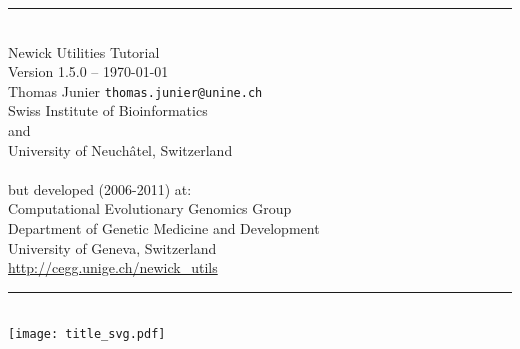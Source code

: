 \documentclass[a4paper,10pt]{report}
\newcommand{\Hrule}[1]{\rule{\linewidth}{#1}}
\begin{document}
\nobibliography*

\begin{titlepage}
\begin{center}
\Hrule{0.5mm} \\[0.8cm]
{\Huge Newick Utilities Tutorial} \\[0.5cm]
Version 1.5.0 -- \today \\
\medskip
Thomas Junier \texttt{thomas.junier@unine.ch} \\
Swiss Institute of Bioinformatics \\
and \\
University of Neuch\^{a}tel, Switzerland \\
   \\
but developed (2006-2011) at: \\
Computational Evolutionary Genomics Group \\
Department of Genetic Medicine and Development \\
University of Geneva, Switzerland \\
\medskip
\url{http://cegg.unige.ch/newick_utils}
\Hrule{0.5mm}
\\[2cm]
\texttt{[image: title\_svg.pdf]}
\end{center}
\end{titlepage}

\tableofcontents











\appendix












% 

% 
\end{document}
